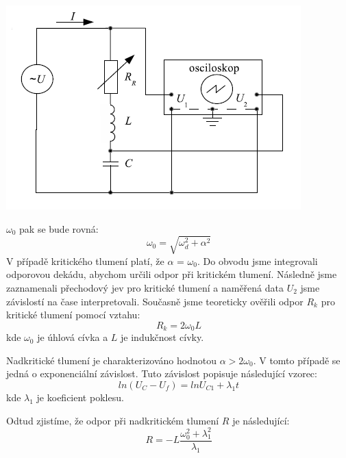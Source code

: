 \documentclass[a4paper,11pt]{article}
\begin{document}
\begin{minipage}[t]{0.5\textwidth} 
            \centering
            \includegraphics[scale=0.5]{imp2}
            \captionsetup{justification=centering, font=footnotesize}
            \label{fig:imp2}
            \vspace{10pt}
            \raggedright
            $\omega_0$ pak se bude rovná:
            \begin{equation}
                \omega_0 = \sqrt{\omega_d^2+\alpha^2}
            \end{equation}
            V případě kritického tlumení platí, že $\alpha$ = $\omega_0$. Do obvodu jsme integrovali odporovou dekádu, abychom určili odpor při kritickém tlumení. Následně jsme zaznamenali přechodový jev pro kritické tlumení a naměřená data $U_2$ jsme závislostí na čase interpretovali. Současně jsme teoreticky ověřili odpor $R_k$ pro kritické tlumení pomocí vztahu: 
            \begin{equation}
                R_k = 2 \omega_0 L
            \end{equation}
            kde $\omega_0$ je úhlová cívka a $L$ je indukčnost cívky.
            \par Nadkritické tlumení je charakterizováno hodnotou $\alpha > 2\omega_0$. V tomto případě se jedná o exponenciální závislost. Tuto závislost popisuje následující vzorec: 
            \begin{equation}
                ln(U_C-U_f) = lnU_{C1} + \lambda_1 t
            \end{equation}
            kde $\lambda_1$ je koeficient poklesu. 
            \par Odtud zjistíme, že odpor při nadkritickém tlumení $R$ je následující: 
            \begin{equation}
                R = -L \frac{\omega_0^2 + \lambda_1^2}{\lambda_1}
            \end{equation}

\end{minipage}
\end{document}
